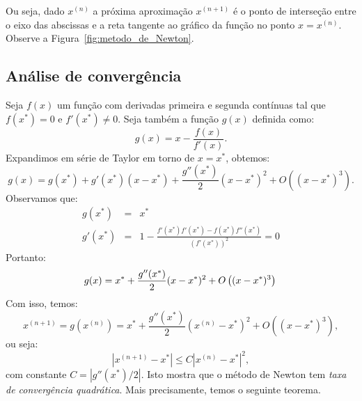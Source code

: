 Ou seja, dado $x^{(n)}$ a próxima aproximação $x^{(n+1)}$ é o ponto de interseção entre o eixo das abscissas e a reta tangente ao gráfico da função no ponto $x = x^{(n)}$. Observe a Figura~\ref{fig:metodo_de_Newton}.

\subsection{Análise de convergência}\label{Analise_conv_Newton}

Seja $f(x)$ um função com derivadas primeira e segunda contínuas tal que $f(x^*)=0$ e $f'(x^*)\neq 0$. Seja também a função $g(x)$ definida como:
\begin{equation*}
  g(x)=x-\frac{f(x)}{f'(x)}.
\end{equation*}
Expandimos em série de Taylor em torno de $x = x^*$, obtemos:
\begin{equation*}
  g(x)=g(x^*)+g'(x^*)(x-x^*) + \frac{g''(x^*)}{2}(x-x^*)^2 + O\left((x-x^*)^3\right).
\end{equation*}
Observamos que:
\begin{eqnarray*}
g(x^*) &=& x^*\\
g'(x^*) &=& 1 - \frac{f'(x^*)f'(x^*)-f(x^*)f''(x^*)}{\left(f'(x^*)\right)^2} = 0
\end{eqnarray*}
Portanto:
\begin{equation*}
g(x) = x^* + \frac{g''(x^*)}{2}(x-x^*)^2 + O\left((x-x^*)^3\right)\\
\end{equation*}
Com isso, temos:
\begin{equation*}
x^{(n+1)} = g(x^{(n)}) =  x^*+ \frac{g''(x^*)}{2}(x^{(n)}-x^*)^2 + O\left((x-x^*)^3\right),
\end{equation*}
ou seja:
\begin{equation*}
\left|x^{(n+1)}-x^*\right| \leq C\left|x^{(n)}-x^*\right|^2,
\end{equation*}
com constante $C = \left|g''(x^*)/2\right|$. Isto mostra que o método de Newton tem \emph{taxa de convergência quadrática}. Mais precisamente, temos o seguinte teorema.

